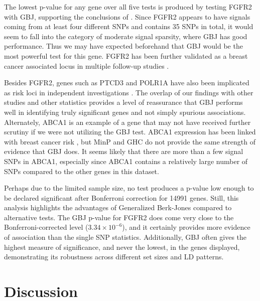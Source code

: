 \documentclass[12pt]{article}
\begin{document}
The lowest p-value for any gene over all five tests is produced by testing FGFR2 with GBJ, 
supporting the conclusions of \citet{CGEMS}.  
Since FGFR2 appears to have signals coming from at least four different SNPs and contains 35 SNPs in total, 
it would seem to fall into the category of moderate signal sparsity, where GBJ has good performance. 
Thus we may have expected beforehand that GBJ would be the most powerful test for this gene.
FGFR2 has been further validated as a breast cancer associated locus in multiple follow-up studies 
\citep{FGFR2_meyer, FGFR2_jie}.

Besides FGFR2, genes such as PTCD3 and POLR1A have also been implicated as risk loci in 
independent investigations \citep{PTCD3, dmGWAS}.  
The overlap of our findings with other studies and other statistics provides a level
of reassurance that GBJ performs well in identifying truly significant genes and not simply 
spurious associations.
Alternately, ABCA1 is an example of a gene that may not have received further scrutiny if we 
were not utilizing the GBJ test. 
ABCA1 expression has been linked with breast cancer risk \citep{ABCA1}, but MinP and GHC 
do not provide the same strength of evidence that GBJ does. 
It seems likely that there are more than a few signal SNPs in ABCA1, especially since ABCA1 
contains a relatively large number of SNPs compared to the other genes in this dataset.

Perhaps due to the limited sample size, no test produces a p-value low enough to be 
declared significant after Bonferroni correction for 14991 genes.  
Still, this analysis highlights the advantages of Generalized Berk-Jones compared to alternative tests.  
The GBJ p-value for FGFR2 does come very close to the Bonferroni-corrected level 
($3.34 \times 10^{-6}$), and it certainly provides more evidence of association than the single SNP statistics.  
Additionally, GBJ often gives the highest measure of significance, and never the lowest, 
in the genes displayed, demonstrating its robustness across different set sizes and LD patterns. 



\section{Discussion}
\label{p2_sec:discussion}
\end{document}
